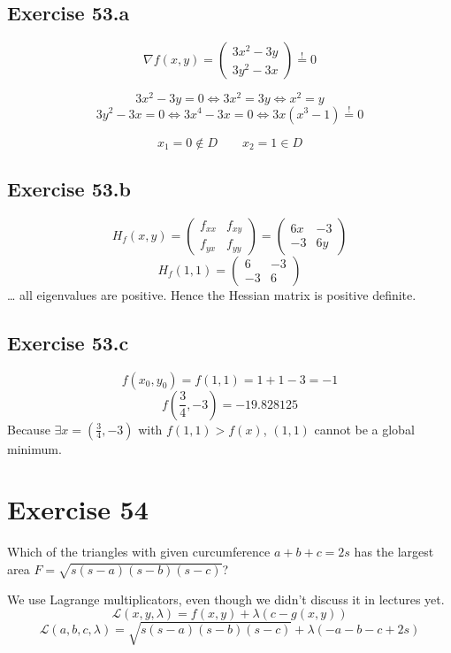 \documentclass[a4paper]{article}
\theoremstyle{definition}
\begin{document}
\subsection{Exercise 53.a}
\[ \nabla f(x,y) = \begin{pmatrix} 3x^2 - 3y \\ 3y^2 - 3x \end{pmatrix} \stackrel{!}{=} 0 \]

\[ 3x^2 - 3y = 0 \iff 3x^2 = 3y \iff x^2 = y \]
\[ 3y^2 - 3x = 0 \iff 3x^4 - 3x = 0 \iff 3x (x^3 - 1) \overset{!}{=} 0 \]

\[ x_1 = 0 \not\in D \qquad x_2 = 1 \in D \]

\subsection{Exercise 53.b}
\[ H_f(x,y) = \begin{pmatrix} f_{xx} & f_{xy} \\ f_{yx} & f_{yy} \end{pmatrix} = \begin{pmatrix} 6x & -3 \\ -3 & 6y \end{pmatrix} \]
\[ H_f(1,1) = \begin{pmatrix} 6 & -3 \\ -3 & 6 \end{pmatrix} \]
\dots
all eigenvalues are positive. Hence the Hessian matrix is positive definite.

\subsection{Exercise 53.c}
\[ f(x_0, y_0) = f(1, 1) = 1 + 1 - 3 = -1 \]
\[ f(\frac34, -3) = -19.828125 \]
Because $\exists x = (\frac34, -3)$ with $f(1, 1) > f(x)$, $(1,1)$ cannot be a global minimum.

\section{Exercise 54}
\begin{ex}
  Which of the triangles with given curcumference $a + b + c = 2s$ has the largest area
  $F = \sqrt{s (s - a) (s - b) (s - c)}$?
\end{ex}

We use Lagrange multiplicators, even though we didn't discuss it in lectures yet.
\[ \mathcal{L}(x,y,\lambda) = f(x,y) + \lambda (c - g(x,y)) \]
\[ \mathcal{L}(a,b,c,\lambda) = \sqrt{s (s-a) (s-b) (s-c)} + \lambda (-a - b - c + 2s) \]
\end{document}
